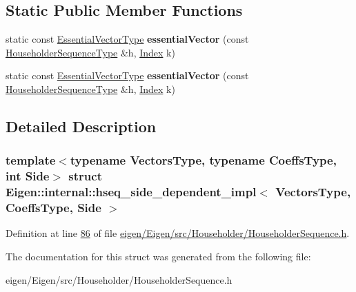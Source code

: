 \subsection*{Static Public Member Functions}
\begin{DoxyCompactItemize}
\item 
\mbox{\label{struct_eigen_1_1internal_1_1hseq__side__dependent__impl_ad783e05cccf4f436e44769df2bb199af}} 
static const \hyperlink{group___core___module_class_eigen_1_1_block}{Essential\+Vector\+Type} {\bfseries essential\+Vector} (const \hyperlink{group___householder___module_class_eigen_1_1_householder_sequence}{Householder\+Sequence\+Type} \&h, \hyperlink{namespace_eigen_a62e77e0933482dafde8fe197d9a2cfde}{Index} k)
\item 
\mbox{\label{struct_eigen_1_1internal_1_1hseq__side__dependent__impl_ad783e05cccf4f436e44769df2bb199af}} 
static const \hyperlink{group___core___module_class_eigen_1_1_block}{Essential\+Vector\+Type} {\bfseries essential\+Vector} (const \hyperlink{group___householder___module_class_eigen_1_1_householder_sequence}{Householder\+Sequence\+Type} \&h, \hyperlink{namespace_eigen_a62e77e0933482dafde8fe197d9a2cfde}{Index} k)
\end{DoxyCompactItemize}


\subsection{Detailed Description}
\subsubsection*{template$<$typename Vectors\+Type, typename Coeffs\+Type, int Side$>$\newline
struct Eigen\+::internal\+::hseq\+\_\+side\+\_\+dependent\+\_\+impl$<$ Vectors\+Type, Coeffs\+Type, Side $>$}



Definition at line \hyperlink{eigen_2_eigen_2src_2_householder_2_householder_sequence_8h_source_l00086}{86} of file \hyperlink{eigen_2_eigen_2src_2_householder_2_householder_sequence_8h_source}{eigen/\+Eigen/src/\+Householder/\+Householder\+Sequence.\+h}.



The documentation for this struct was generated from the following file\+:\begin{DoxyCompactItemize}
\item 
eigen/\+Eigen/src/\+Householder/\+Householder\+Sequence.\+h\end{DoxyCompactItemize}
